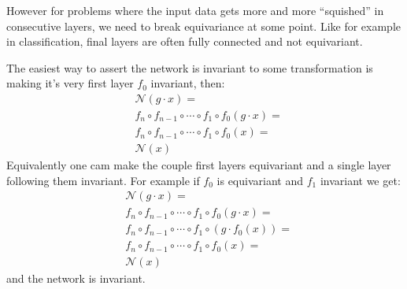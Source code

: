         However for problems where the input data gets more and more ``squished'' in consecutive layers,
        we need to break equivariance at some point. Like for example in classification,
        final layers are often fully connected and not equivariant. \par
        The easiest way to assert the network is invariant to some transformation
        is making it's very first layer $f_0$ invariant, then:
        \begin{align*}
            & \mathcal{N}(g\cdot x) = \\
            & f_n \circ f_{n-1} \circ \cdots \circ f_1 \circ f_0(g\cdot x) =  \\
            & f_n \circ f_{n-1} \circ \cdots \circ f_1 \circ f_0(x) = \\
            & \mathcal{N}(x)
        \end{align*}
        Equivalently one cam make the couple first layers equivariant and a single layer
        following them invariant. For example if $f_0$ is equivariant and $f_1$ invariant we get:
        \begin{align*}
            & \mathcal{N}(g\cdot x) = \\
            & f_n \circ f_{n-1} \circ \cdots \circ f_1 \circ f_0(g\cdot x) =  \\
            & f_n \circ f_{n-1} \circ \cdots \circ f_1 \circ \left( g \cdot f_0(x) \right) = \\
            & f_n \circ f_{n-1} \circ \cdots \circ f_1 \circ f_0(x) = \\
            & \mathcal{N}(x)
        \end{align*}
        and the network is invariant.

